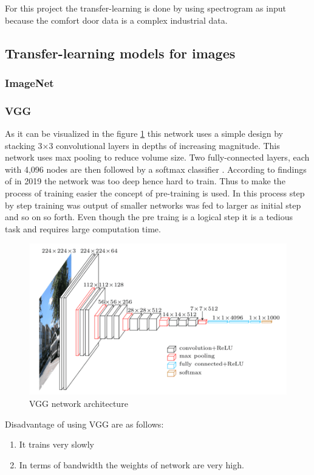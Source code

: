     For this project the transfer-learning is done by using spectrogram as input because the comfort door data is a complex industrial data.
    
    \subsection{Transfer-learning models for images}
    \subsubsection{ImageNet}
 
    \subsubsection{VGG}
    As it can be visualized in the figure \ref{l05} this network uses a simple design by stacking 3×3 convolutional layers in depths of increasing magnitude. This network uses max pooling to reduce volume size. Two fully-connected layers, each with 4,096 nodes are then followed by a softmax classifier \cite{simonyan2014very}. 
    According to findings of \cite{simonyan2014very} in 2019 the network was too deep hence hard to train. Thus to make the process of training easier the concept of pre-training is used. In this process step by step training was output of smaller networks was fed to larger as initial step and so on so forth. 
    Even though the pre traing is a logical step it is a tedious task and requires large computation time.
    
     \begin{figure}[h]
     	\centering
     	\includegraphics[width=0.8\linewidth]{images/imagenet_vgg16.png}
     	\caption{VGG network architecture \cite{simonyan2014very}}
     	\label{l05}	
     \end{figure}
    
    Disadvantage of using VGG are as follows:
    \begin{enumerate}
    	\item It trains very slowly
    	\item In terms of bandwidth the weights of network are very high.
    \end{enumerate}
    

    
   

